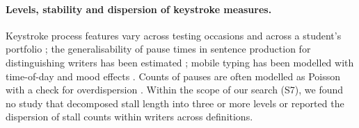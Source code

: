 \paragraph{Levels, stability and dispersion of keystroke measures.} Keystroke process features vary across testing
occasions \cite{deane2015feasibility} and across a student's portfolio \cite{babalola2026stability}; the generalisability
of pause times in sentence production for distinguishing writers has been estimated
\cite{meulemans2022generalizability}; mobile typing has been modelled with time-of-day and mood effects
\cite{vesel2020biaffect}. Counts of pauses are often modelled as Poisson with a check for overdispersion
\cite{gullberg2025deceit}. Within the scope of our search (S7), we found no study that decomposed stall length into
three or more levels or reported the dispersion of stall counts within writers across definitions.
